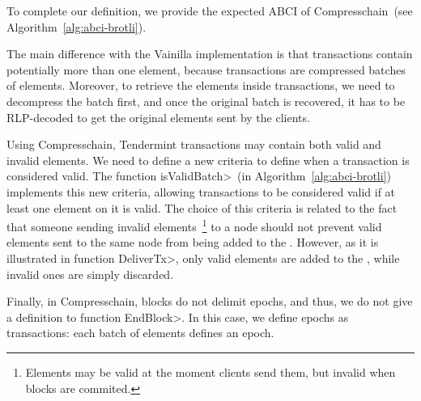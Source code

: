 %
To complete our definition, we provide the expected ABCI of Compresschain~(see
Algorithm~\ref{alg:abci-brotli}).
%

%


The main difference with the Vainilla implementation is that transactions
contain potentially more than one element, because transactions are 
compressed batches of elements.
%
Moreover, to retrieve the elements inside transactions, we need to decompress
the batch first, and once the original batch is recovered, it has to be
RLP-decoded to get the original elements sent by the clients.
%

Using Compresschain, Tendermint transactions may contain both valid
and invalid elements.
%
We need to define a new criteria to define when a transaction is
considered valid.
%
The function \<isValidBatch>~(in Algorithm~\ref{alg:abci-brotli})
implements this new criteria, allowing transactions to be considered valid if at
least one element on it is valid.
%
The choice of this criteria is related to the fact that someone sending invalid
elements~\footnote{Elements may be valid at the moment clients send them, but
invalid when blocks are commited.} to a node should not prevent valid
elements sent to the same node from being added to the \setchain.
%
However, as it is illustrated in function \<DeliverTx>, only valid
elements are added to the \setchain, while invalid ones are simply discarded.

Finally, in Compresschain, blocks do not delimit epochs, and thus, we do not
give a definition to function \<EndBlock>.
%
In this case, we define epochs as transactions: each batch of elements defines an
epoch.

